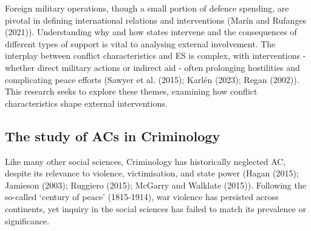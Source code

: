 \documentclass[
]{article}
\begin{document}
Foreign military operations, though a small portion of defence spending,
are pivotal in defining international relations and interventions (Marín
and Rufanges (2021)). Understanding why and how states intervene and the
consequences of different types of support is vital to analysing
external involvement. The interplay between conflict characteristics and
ES is complex, with interventions - whether direct military actions or
indirect aid - often prolonging hostilities and complicating peace
efforts (Sawyer et al. (2015); Karlén (2023); Regan (2002)). This
research seeks to explore these themes, examining how conflict
characteristics shape external interventions.

\subsection{The study of ACs in
Criminology}\label{the-study-of-acs-in-criminology}

Like many other social sciences, Criminology has historically neglected
AC, despite its relevance to violence, victimisation, and state power
(Hagan (2015); Jamieson (2003); Ruggiero (2015); McGarry and Walklate
(2015)). Following the so-called `century of peace' (1815-1914), war
violence has persisted across continents, yet inquiry in the social
sciences has failed to match its prevalence or significance.
\end{document}
